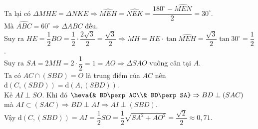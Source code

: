 \begin{ex}
{Ta lại có $\Delta MHE=\Delta NKE\Rightarrow\widehat{MEH}=\widehat{NEK}=\dfrac{180^\circ-\widehat{MEN}}{2}=30^\circ$.\\
Mà $\widehat{ABC}=60^\circ\Rightarrow\Delta ABC$ đều.\\
Suy ra $HE=\dfrac{1}{2}BO=\dfrac{1}{2}\cdot \dfrac{2\sqrt{3}}{2}=\dfrac{\sqrt{3}}{2}\Rightarrow MH=HE\cdot \tan\widehat{MEH}=\dfrac{\sqrt{3}}{2}\tan 30^\circ=\dfrac{1}{2}$.\\
Suy ra $SA=2MH=2\cdot \dfrac{1}{2}=1=AO\Rightarrow\Delta SAO$ vuông cân tại $A$.\\
Ta có $AC\cap (SBD)=O$ là trung điểm của $AC$ nên $ \mathrm{d}(C,(SBD))=\mathrm{d}(A,(SBD))$.\\
Kẻ $AI\perp SO$. Khi đó
$\heva{&
		BD\perp AC\\&
		BD\perp SA} \Rightarrow BD\perp (SAC)$ mà
$AI\subset (SAC)\Rightarrow BD\perp AI\Rightarrow AI\perp (SBD)$.\\
Vậy $ \mathrm{d}(C,(SBD))=AI=\dfrac{1}{2}SO=\dfrac{1}{2}\sqrt{SA^2+AO^2}=\dfrac{\sqrt{2}}{2}\approx 0{,}71$.}
\end{ex}

